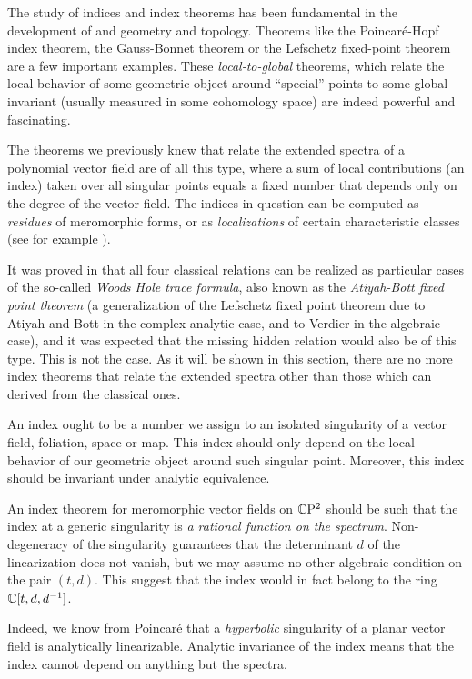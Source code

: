 \documentclass[phd,tocprelim]{cornell}
\begin{document}
The study of indices and index theorems has been fundamental in the development of and geometry and topology. Theorems like the Poincar\'{e}-Hopf index theorem, the Gauss-Bonnet theorem or the Lefschetz fixed-point theorem are a few important examples. These \textit{local-to-global} theorems, which relate the local behavior of some geometric object around ``special'' points to some global invariant (usually measured in some cohomology space) are indeed powerful and fascinating.

The theorems we previously knew that relate the extended spectra of a polynomial vector field are of all this type, where a sum of local contributions (an index) taken over all singular points equals a fixed number that depends only on the degree of the vector field. The indices in question can be computed as \textit{residues} of meromorphic forms, or as \textit{localizations} of certain characteristic classes (see for example \cite{Suwa1998}).

It was proved in \cite{WoodsHole} that all four classical relations can be realized as particular cases of the so-called \textit{Woods Hole trace formula}, also known as the \textit{Atiyah-Bott fixed point theorem} (a generalization of the Lefschetz fixed point theorem due to Atiyah and Bott in the complex analytic case, and to Verdier in the algebraic case), and it was expected that the missing hidden relation would also be of this type. This is not the case. As it will be shown in this section, there are no more index theorems that relate the extended spectra other than those which can derived from the classical ones.

An index ought to be a number we assign to an isolated singularity of a vector field, foliation, space or map. This index should only depend on the local behavior of our geometric object around such singular point. Moreover, this index should be invariant under analytic equivalence.

\begin{remark}
 An index theorem for meromorphic vector fields on $\mathbb{C}\mathrm{P}^2$ should be such that the index at a generic singularity is \textit{a rational function on the spectrum}. Non-degeneracy of the singularity guarantees that the determinant $d$ of the linearization does not vanish, but we may assume no other algebraic condition on the pair $(t,d)$. This suggest that the index would in fact belong to the ring $\mathbb{C}[t,d,d^{-1}]$.
\end{remark}
 
Indeed, we know from Poincar\'{e} that a \textit{hyperbolic} singularity of a planar vector field is analytically linearizable. Analytic invariance of the index means that the index cannot depend on anything but the spectra. 
\end{document}
